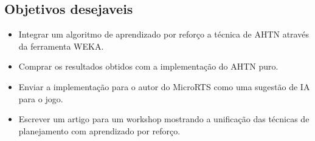 \subsection{Objetivos desejaveis}
\begin{itemize}
	\item Integrar um algoritmo de aprendizado por reforço a técnica de AHTN através da ferramenta WEKA.
	\item Comprar os resultados obtidos com a implementação do AHTN puro.
	\item Enviar a implementação para o autor do MicroRTS como uma sugestão de IA para o jogo.
	\item Escrever um artigo para um workshop mostrando a unificação das técnicas de planejamento com aprendizado por reforço.
\end{itemize}

